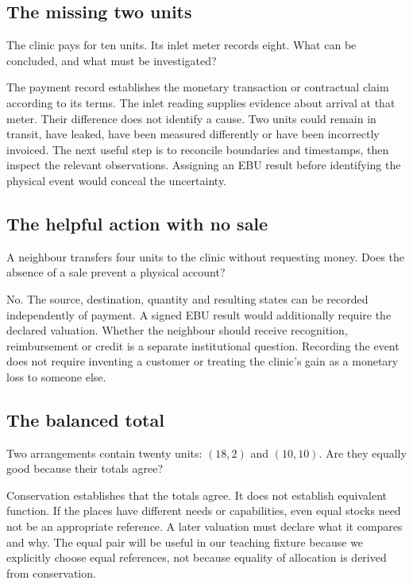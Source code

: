 \subsection{The missing two units}
The clinic pays for ten units. Its inlet meter records eight. What can be concluded, and what must be investigated?

The payment record establishes the monetary transaction or contractual claim according to its terms. The inlet reading supplies evidence about arrival at that meter. Their difference does not identify a cause. Two units could remain in transit, have leaked, have been measured differently or have been incorrectly invoiced. The next useful step is to reconcile boundaries and timestamps, then inspect the relevant observations. Assigning an EBU result before identifying the physical event would conceal the uncertainty.

\subsection{The helpful action with no sale}
A neighbour transfers four units to the clinic without requesting money. Does the absence of a sale prevent a physical account?

No. The source, destination, quantity and resulting states can be recorded independently of payment. A signed EBU result would additionally require the declared valuation. Whether the neighbour should receive recognition, reimbursement or credit is a separate institutional question. Recording the event does not require inventing a customer or treating the clinic's gain as a monetary loss to someone else.

\subsection{The balanced total}
Two arrangements contain twenty units: $(18,2)$ and $(10,10)$. Are they equally good because their totals agree?

Conservation establishes that the totals agree. It does not establish equivalent function. If the places have different needs or capabilities, even equal stocks need not be an appropriate reference. A later valuation must declare what it compares and why. The equal pair will be useful in our teaching fixture because we explicitly choose equal references, not because equality of allocation is derived from conservation.
